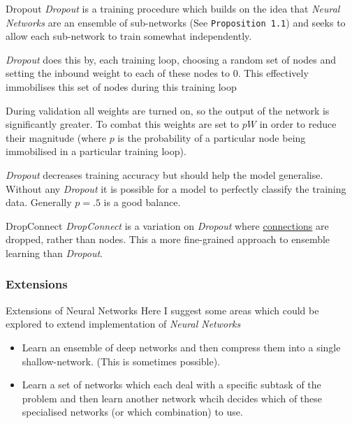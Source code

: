 \documentclass[11pt,a4paper]{article}
\begin{document}
  \begin{definition}{Dropout}
    \textit{Dropout} is a training procedure which builds on the idea that \textit{Neural Networks} are an ensemble of sub-networks (See \texttt{Proposition 1.1}) and seeks to allow each sub-network to train somewhat independently.
    \par \textit{Dropout} does this by, each training loop, choosing a random set of nodes and setting the inbound weight to each of these nodes to 0. This effectively immobilises this set of nodes during this training loop
    \par During validation all weights are turned on, so the output of the network is significantly greater. To combat this weights are set to $pW$ in order to reduce their magnitude (where $p$ is the probability of a particular node being immobilised in a particular training loop).
    \par \textit{Dropout} decreases training accuracy but should help the model generalise. Without any \textit{Dropout} it is possible for a model to perfectly classify the training data. Generally $p=.5$ is a good balance.
  \end{definition}

  \begin{definition}{DropConnect}
    \textit{DropConnect} is a variation on \textit{Dropout} where \underline{connections} are dropped, rather than nodes. This a more fine-grained approach to ensemble learning than \textit{Dropout}.
  \end{definition}

\subsubsection{Extensions}

  \begin{proposition}{Extensions of Neural Networks}
    Here I suggest some areas which could be explored to extend implementation of \textit{Neural Networks}
    \begin{itemize}
      \item Learn an ensemble of deep networks and then compress them into a single shallow-network. (This is sometimes possible).
      \item Learn a set of networks which each deal with a specific subtask of the problem and then learn another network whcih decides which of these specialised networks (or which combination) to use.
    \end{itemize}
  \end{proposition}
\end{document}
